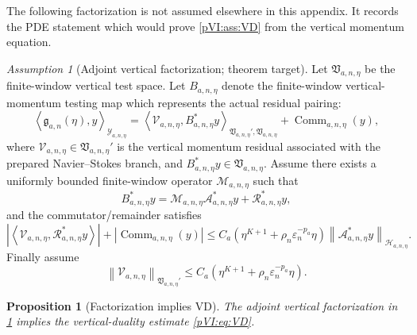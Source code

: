 \documentclass[11pt]{article}
\numberwithin{equation}{section}
\theoremstyle{plain}
\newtheorem{proposition}{Proposition}[section]
\theoremstyle{definition}
\theoremstyle{remark}
\newtheorem{assumption}{Assumption}[section]
\newcommand{\eps}{\varepsilon}
\newcommand{\norm}[2]{\left\|#1\right\|_{#2}}
\newcommand{\inner}[2]{\left\langle #1,#2\right\rangle}
\newcommand{\calA}{\mathcal A}
\newcommand{\calH}{\mathcal H}
\newcommand{\calM}{\mathcal M}
\newcommand{\calR}{\mathcal R}
\newcommand{\calV}{\mathcal V}
\newcommand{\calY}{\mathcal Y}
\begin{document}
The following factorization is not assumed elsewhere in this appendix.  It records the PDE statement
which would prove \cref{pVI:ass:VD} from the vertical momentum equation.

\begin{assumption}[Adjoint vertical factorization; theorem target]\label{pVI:ass:factorization-target}
Let \(\mathfrak V_{a,n,\eta}\) be the finite-window vertical test space.  Let \(B_{a,n,\eta}\) denote the finite-window vertical-momentum testing map which represents the
actual residual pairing:
\[
        \inner{\mathfrak g_{a,n}(\eta)}{y}_{\calY_{a,n,\eta}}
        =
        \inner{\calV_{a,n,\eta}}{B_{a,n,\eta}^*y}_{\mathfrak V_{a,n,\eta}',\mathfrak V_{a,n,\eta}}
        +
        \operatorname{Comm}_{a,n,\eta}(y),
\]
where \(\calV_{a,n,\eta}\in\mathfrak V_{a,n,\eta}'\) is the vertical momentum residual associated with the prepared
Navier--Stokes branch, and \(B_{a,n,\eta}^*y\in\mathfrak V_{a,n,\eta}\).  Assume there exists a uniformly bounded finite-window operator
\(\calM_{a,n,\eta}\) such that
\begin{equation}\label{pVI:eq:factorization}
        B_{a,n,\eta}^*y
        =
        \calM_{a,n,\eta}\calA_{a,n,\eta}^*y
        +
        \calR_{a,n,\eta}^*y,
\end{equation}
and the commutator/remainder satisfies
\begin{equation}\label{pVI:eq:factorization-remainder}
        \left|
        \inner{\calV_{a,n,\eta}}{\calR_{a,n,\eta}^*y}
        \right|
        +
        |\operatorname{Comm}_{a,n,\eta}(y)|
        \le
        C_a
        \left(
        \eta^{K+1}
        +
        \rho_n\eps_n^{-p_a}\eta
        \right)
        \norm{\calA_{a,n,\eta}^*y}{\calH_{a,n,\eta}} .
\end{equation}
Finally assume
\begin{equation}\label{pVI:eq:vertical-residual-size}
        \norm{\calV_{a,n,\eta}}{\mathfrak V_{a,n,\eta}'}
        \le
        C_a
        \left(
        \eta^{K+1}
        +
        \rho_n\eps_n^{-p_a}\eta
        \right).
\end{equation}
\end{assumption}

\begin{proposition}[Factorization implies VD]\label{pVI:prop:factorization-implies-VD}
The adjoint vertical factorization in \cref{pVI:ass:factorization-target} implies the vertical-duality
estimate \eqref{pVI:eq:VD}.
\end{proposition}
\end{document}
